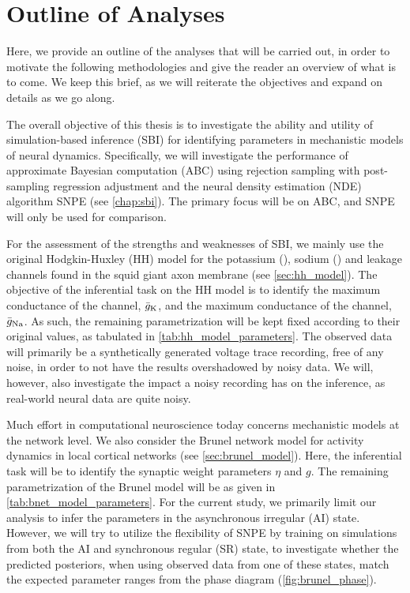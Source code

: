 \section{Outline of Analyses}

Here, we provide an outline of the analyses that will be carried out, in order to motivate the following methodologies and give the reader an overview of what is to come. We keep this brief, as we will reiterate the objectives and expand on details as we go along.

The overall objective of this thesis is to investigate the ability and utility of simulation-based inference (SBI) for identifying parameters in mechanistic models of neural dynamics. Specifically, we will investigate the performance of approximate Bayesian computation (ABC) using rejection sampling with post-sampling regression adjustment and the neural density estimation (NDE) algorithm SNPE (see \cref{chap:sbi}). The primary focus will be on ABC, and SNPE will only be used for comparison. 

For the assessment of the strengths and weaknesses of SBI, we mainly use the original Hodgkin-Huxley (HH) model for the potassium (\K), sodium (\Na) and leakage channels found in the squid giant axon membrane (see \cref{sec:hh_model}). The objective of the inferential task on the HH model is to identify the maximum conductance of the \K channel, $\bar{g}_{\mathrm{K}}$, and the maximum conductance of the \Na channel, $\bar{g}_{\mathrm{Na}}$. As such, the remaining parametrization will be kept fixed according to their original values, as tabulated in \autoref{tab:hh_model_parameters}. The observed data will primarily be a synthetically generated voltage trace recording, free of any noise, in order to not have the results overshadowed by noisy data. We will, however, also investigate the impact a noisy recording has on the inference, as real-world neural data are quite noisy. 

Much effort in computational neuroscience today concerns mechanistic models at the network level. We also consider the Brunel network model for activity dynamics in local cortical networks (see \cref{sec:brunel_model}). Here, the inferential task will be to identify the synaptic weight parameters $\eta$ and $g$. The remaining parametrization of the Brunel model will be as given in \autoref{tab:bnet_model_parameters}. For the current study, we primarily limit our analysis to infer the parameters in the asynchronous irregular (AI) state. However, we will try to utilize the flexibility of SNPE by training on simulations from both the AI and synchronous regular (SR) state, to investigate whether the predicted posteriors, when using observed data from one of these states, match the expected parameter ranges from the phase diagram (\autoref{fig:brunel_phase}).

